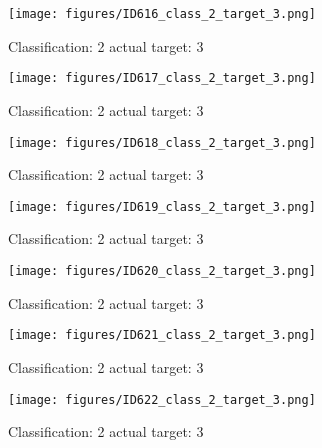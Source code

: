 \begin{figure}[h!]
\begin{center}
\texttt{[image: figures/ID616\_class\_2\_target\_3.png]}
\end{center}
\caption{ Classification: 2 actual target: 3}
\label{fig:ID616_class_2_target_3}
\end{figure}
\begin{figure}[h!]
\begin{center}
\texttt{[image: figures/ID617\_class\_2\_target\_3.png]}
\end{center}
\caption{ Classification: 2 actual target: 3}
\label{fig:ID617_class_2_target_3}
\end{figure}
\begin{figure}[h!]
\begin{center}
\texttt{[image: figures/ID618\_class\_2\_target\_3.png]}
\end{center}
\caption{ Classification: 2 actual target: 3}
\label{fig:ID618_class_2_target_3}
\end{figure}
\begin{figure}[h!]
\begin{center}
\texttt{[image: figures/ID619\_class\_2\_target\_3.png]}
\end{center}
\caption{ Classification: 2 actual target: 3}
\label{fig:ID619_class_2_target_3}
\end{figure}
\begin{figure}[h!]
\begin{center}
\texttt{[image: figures/ID620\_class\_2\_target\_3.png]}
\end{center}
\caption{ Classification: 2 actual target: 3}
\label{fig:ID620_class_2_target_3}
\end{figure}
\begin{figure}[h!]
\begin{center}
\texttt{[image: figures/ID621\_class\_2\_target\_3.png]}
\end{center}
\caption{ Classification: 2 actual target: 3}
\label{fig:ID621_class_2_target_3}
\end{figure}
\begin{figure}[h!]
\begin{center}
\texttt{[image: figures/ID622\_class\_2\_target\_3.png]}
\end{center}
\caption{ Classification: 2 actual target: 3}
\label{fig:ID622_class_2_target_3}
\end{figure}
